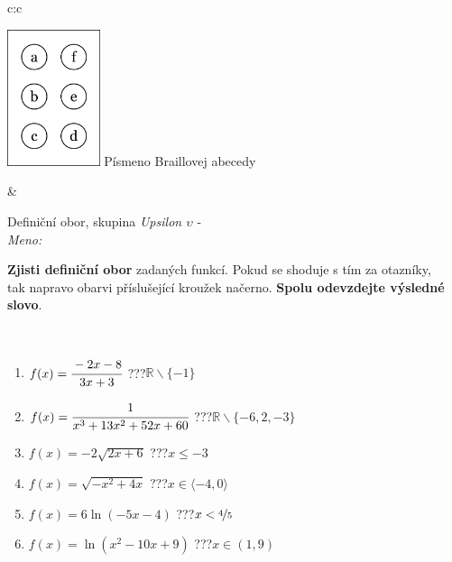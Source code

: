 \documentclass[10pt]{report}
\begin{document}
\begin{tabular}{c:c}
\begin{minipage}[c][104.5mm][t]{0.5\linewidth}
\begin{center}
\begin{minipage}{0.20\linewidth}
\begin{center}
\includegraphics[height=40mm]{../images/braille.png}
{\small Písmeno Braillovej abecedy}
\end{center}
\end{minipage}
\end{center}
\end{minipage}
&
\begin{minipage}[c][104.5mm][t]{0.5\linewidth}
\begin{center}
\vspace{7mm}
{\huge Definiční obor, skupina \textit{Upsilon $\upsilon$} -}\\[5mm]
\textit{Meno:}\phantom{xxxxxxxxxxxxxxxxxxxxxxxxxxxxxxxxxxxxxxxxxxxxxxxxxxxxxxxxxxxxxxxxx}\\[5mm]
\begin{minipage}{0.95\linewidth}
\textbf{Zjisti definiční obor} zadaných funkcí. Pokud se shoduje s tím za otazníky,\\tak napravo obarvi příslušející kroužek načerno. \textbf{Spolu odevzdejte výsledné slovo}.
\end{minipage}
\\[1mm]
\begin{minipage}{0.79\linewidth}
\begin{center}
\begin{varwidth}{\linewidth}
\begin{enumerate}
\normalsizerrr
\item $f(x)=\cfrac{-2x-8}{3x+3}$\quad \dotfill\; ???\;\dotfill \quad $\mathbb{R}\smallsetminus\{-1\}$
\item $f(x)=\cfrac{1}{x^3+13x^2+52x+60}$\quad \dotfill\; ???\;\dotfill \quad $\mathbb{R}\smallsetminus\{-6,2,-3\}$
\item $f(x)=-2\sqrt{2x+6}$\quad \dotfill\; ???\;\dotfill \quad $x\leq-3$
\item $f(x)=\sqrt{-x^2+4x}$\quad \dotfill\; ???\;\dotfill \quad $x\in\langle-4 , 0\rangle$
\item $f(x)=6\ln{(-5x-4)}$\quad \dotfill\; ???\;\dotfill \quad $x<\nicefrac{4}{5}$
\item $f(x)=\ln{(x^2-10x+9)}$\quad \dotfill\; ???\;\dotfill \quad $x\in(1 , 9)$

\end{enumerate}
\end{varwidth}
\end{center}
\end{minipage}
\end{center}
\end{minipage}
\end{tabular}
\end{document}
